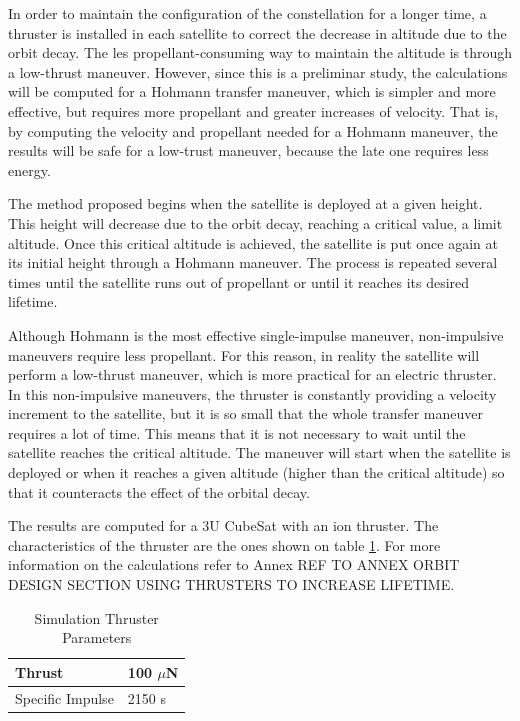 In order to maintain the configuration of the constellation for a longer time, a thruster is installed in each satellite to correct the decrease in altitude due to the orbit decay. The les propellant-consuming way to maintain the altitude is through a low-thrust maneuver. However, since this is a preliminar study, the calculations will be computed for a Hohmann transfer maneuver, which is simpler and more effective, but requires more propellant and greater increases of velocity. That is, by computing the velocity and propellant needed for a Hohmann maneuver, the results will be safe for a low-trust maneuver, because the late one requires less energy.

The method proposed begins when the satellite is deployed at a given height. This height will decrease due to the orbit decay, reaching a critical value, a limit altitude. Once this critical altitude is achieved, the satellite is put once again at its initial height through a Hohmann maneuver.
The process is repeated several times until the satellite runs out of propellant or until it reaches its desired lifetime.

Although Hohmann is the most effective single-impulse maneuver, non-impulsive maneuvers require less propellant. For this reason, in reality the satellite will perform a low-thrust maneuver, which is more practical for an electric thruster. In this non-impulsive maneuvers, the thruster is constantly providing a velocity increment to the satellite, but it is so small that the whole transfer maneuver requires a lot of time. This means that it is not necessary to wait until the satellite reaches the critical altitude. The maneuver will start when the satellite is deployed or when it reaches a given altitude (higher than the critical altitude) so that it counteracts the effect of the orbital decay.

The results are computed for a 3U CubeSat with an ion thruster. The characteristics of the thruster are the ones shown on table \ref{thrustspimpulse}. For more information on the calculations refer to Annex REF TO ANNEX ORBIT DESIGN SECTION USING THRUSTERS TO INCREASE LIFETIME.

\begin{table}[h!]
\begin{center}
\begin{tabular}{ | l | l | }
\hline
Thrust & 100 $\mu$N \\ 
\hline 
Specific Impulse & 2150 s \\
\hline
\end{tabular}
\caption{Simulation Thruster Parameters}
\label{thrustspimpulse}
\end{center}
\end{table}

